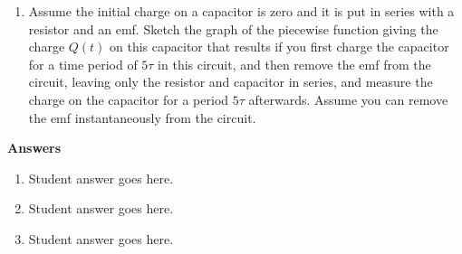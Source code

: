\documentclass{article}
\begin{document}
\begin{enumerate}
\begin{enumerate}
    \item Assume the initial charge on a capacitor is zero and it is put in series with a resistor and an emf. Sketch the graph of the piecewise function giving the charge $Q(t)$ on this capacitor that results if you first charge the capacitor for a time period of $5\tau$ in this circuit, and then remove the emf from the circuit, leaving only the resistor and capacitor in series, and measure the charge on the capacitor for a period $5\tau$ afterwards. Assume you can remove the emf instantaneously from the circuit. 

  

\end{enumerate}

\color{blue}
\textbf{Answers}
\begin{enumerate}
    \item Student answer goes here.
    \item Student answer goes here.
    \item Student answer goes here.
\end{enumerate}
\color{black}

\end{enumerate}





\hrulefill
\end{document}
